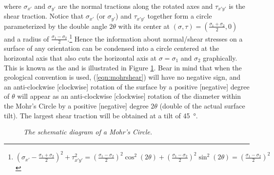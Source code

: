 where $\sigma_{x'}$ and $\sigma_{y'}$ are the normal tractions along the rotated axes and $\tau_{x'y'}$ is the shear traction. Notice that $\sigma_{x'}$ (or $\sigma_{y'}$) and $\tau_{x'y'}$ together form a circle parameterized by the double angle $2\theta$ with its center at $(\sigma, \tau) = (\frac{\sigma_1 + \sigma_2}{2}, 0)$ and a radius of $\frac{\sigma_1 - \sigma_2}{2}$.\footnote{$
(\sigma_{x'} - \frac{\sigma_1 + \sigma_2}{2})^2 + \tau_{x'y'}^2 = (\frac{\sigma_1 - \sigma_2}{2})^2\cos^2(2\theta) + (\frac{\sigma_1 - \sigma_2}{2})^2 \sin^2(2\theta) = (\frac{\sigma_1 - \sigma_2}{2})^2$}
Hence the information about normal/shear stresses on a surface of any orientation can be condensed into a circle centered at the horizontal axis that also cuts the horizontal axis at $\sigma = \sigma_1$ and $\sigma_2$ graphically. This is known as the  and is illustrated in Figure \ref{fig:mohr1}. Bear in mind that when the geological convention is used, (\ref{eqn:mohrshear}) will have no negative sign, and an anti-clockwise [clockwise] rotation of the surface by a positive [negative] degree of $\theta$ will appear as an anti-clockwise [clockwise] rotation of the diameter within the Mohr's Circle by a positive [negative] degree $2\theta$ (double of the actual surface tilt). The largest shear traction will be obtained at a tilt of \SI{45}{\degree}.
 
\begin{figure}
\centering
    \caption{\textit{The schematic diagram of a Mohr's Circle.}}
    \label{fig:mohr1}
\end{figure}

